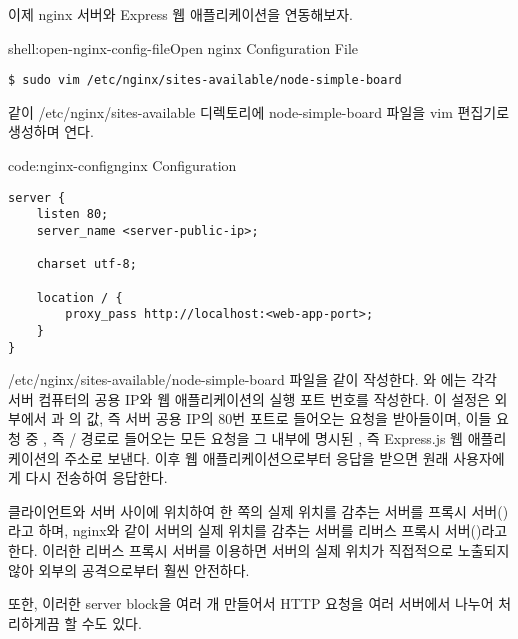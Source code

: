 이제 nginx 서버와 Express 웹 애플리케이션을 연동해보자.

\begin{shellenv}{shell:open-nginx-config-file}{Open nginx Configuration File}\begin{verbatim}
$ sudo vim /etc/nginx/sites-available/node-simple-board
\end{verbatim}
\end{shellenv}

\과 같이 /etc/nginx/sites-available 디렉토리에 node-simple-board 파일을 vim 편집기로 생성하며 연다.

\begin{codeenv}{code:nginx-config}{nginx Configuration}\begin{verbatim}
server {
    listen 80;
    server_name <server-public-ip>;

    charset utf-8;

    location / {
        proxy_pass http://localhost:<web-app-port>;
    }
}
\end{verbatim}
\end{codeenv}

/etc/nginx/sites-available/node-simple-board 파일을 \와 같이 작성한다. 와 에는 각각 서버 컴퓨터의 공용 IP와 웹 애플리케이션의 실행 포트 번호를 작성한다. 이 설정은 외부에서 과 의 값, 즉 서버 공용 IP의 80번 포트로 들어오는 요청을 받아들이며, 이들 요청 중 , 즉 / 경로로 들어오는 모든 요청을 그 내부에 명시된 , 즉 Express.js 웹 애플리케이션의 주소로 보낸다. 이후 웹 애플리케이션으로부터 응답을 받으면 원래 사용자에게 다시 전송하여 응답한다.


클라이언트와 서버 사이에 위치하여 한 쪽의 실제 위치를 감추는 서버를 프록시 서버()라고 하며, nginx와 같이 서버의 실제 위치를 감추는 서버를 리버스 프록시 서버()라고 한다. 이러한 리버스 프록시 서버를 이용하면 서버의 실제 위치가 직접적으로 노출되지 않아 외부의 공격으로부터 훨씬 안전하다.

또한, 이러한 server block을 여러 개 만들어서 HTTP 요청을 여러 서버에서 나누어 처리하게끔 할 수도 있다.

